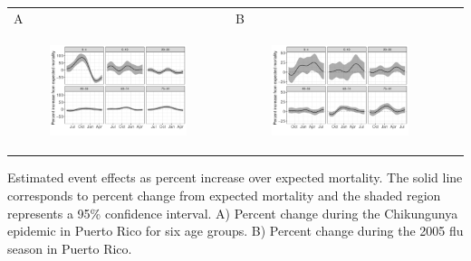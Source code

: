 \documentclass[11pt]{article}
\begin{document}
\begin{suppfigure}[ht]
	\begin{tabular}{lll}
	A&B\\
	\begin{subfigure}[t]{0.49\linewidth}
		\centering
		\includegraphics[width=1\linewidth]{figs/supp-figure-3a.pdf} 
	\end{subfigure}&
	\begin{subfigure}[t]{0.49\linewidth}
		\centering
		\includegraphics[width=1\linewidth]{figs/supp-figure-3b.pdf}
	\end{subfigure}&\\
    \end{tabular}
    \caption{Estimated event effects as percent increase over expected mortality. The solid line corresponds to percent change from expected mortality and the shaded region represents a 95\% confidence interval. A) Percent change during the Chikungunya epidemic in Puerto Rico for six age groups. B) Percent change during the 2005 flu season in Puerto Rico.}
	\label{supp-fig:chikungunya-agegroups}
\end{suppfigure}
\end{document}
